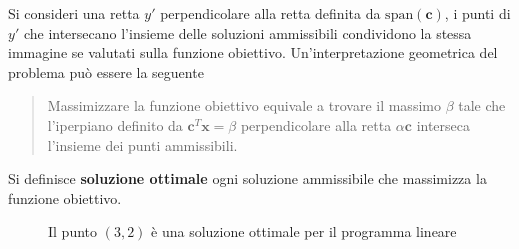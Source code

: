 \documentclass[10pt, letterpaper]{report}
\begin{document}
\begin{figure}[h]
\end{figure}
Si consideri una retta $y'$ perpendicolare alla retta definita da $\text{span}(\mathbf c)$, i punti di $y'$ che intersecano l'insieme delle soluzioni ammissibili condividono la stessa immagine se valutati sulla funzione obiettivo. Un'interpretazione geometrica del problema può essere la seguente\begin{quotation}
    Massimizzare la funzione obiettivo equivale a trovare il massimo $\beta$ tale che l'iperpiano definito da $\mathbf c^T\mathbf x = \beta$ perpendicolare alla retta $\alpha \mathbf c$ interseca l'insieme dei punti ammissibili.
\end{quotation}
Si definisce \textbf{soluzione ottimale} ogni soluzione ammissibile che massimizza la funzione obiettivo.
\begin{figure}[h]
    \caption{Il punto $(3,2)$ è una soluzione ottimale per il programma lineare}
        \label{LP_esempio3}
\end{figure}
\end{document}
